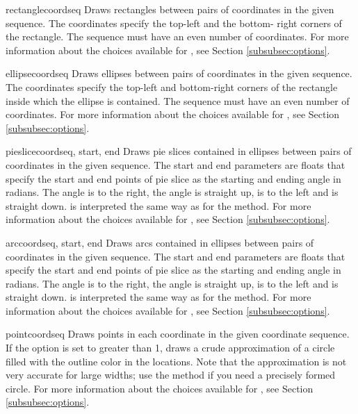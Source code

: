 \begin{methoddesc}{rectangle}{coordseq}
Draws rectangles between pairs of coordinates in the given sequence. The 
coordinates specify the top-left and the bottom- right corners of the 
rectangle. The sequence must have an even number of coordinates. For more 
information about the choices available for , see 
Section \ref{subsubsec:options}.
\end{methoddesc}

\begin{methoddesc}{ellipse}{coordseq}
Draws ellipses between pairs of coordinates in the given sequence. The
coordinates specify the top-left and bottom-right corners of the
rectangle inside which the ellipse is contained.  The sequence must
have an even number of coordinates. 
For more information about the choices available for , see 
Section \ref{subsubsec:options}.
\end{methoddesc}

\begin{methoddesc}{pieslice}{coordseq, start, end}
Draws pie slices contained in ellipses between pairs of coordinates in
the given sequence. The start and end parameters are floats that
specify the start and end points of pie slice as the starting and
ending angle in radians. The angle  is to the right, the angle
 is straight up,  is to the left and
is straight down.  is interpreted the same way as for
the  method.
For more 
information about the choices available for , see 
Section \ref{subsubsec:options}.
\end{methoddesc}

\begin{methoddesc}{arc}{coordseq, start, end}
Draws arcs contained in ellipses between pairs of coordinates in
the given sequence. The start and end parameters are floats that
specify the start and end points of pie slice as the starting and
ending angle in radians. The angle  is to the right, the angle
 is straight up,  is to the left and
is straight down.  is interpreted the same way as for
the  method.  For more information about the choices
available for , see Section
\ref{subsubsec:options}.
\end{methoddesc}

\begin{methoddesc}{point}{coordseq}
Draws points in each coordinate in the given coordinate sequence. If the 
 option is set to greater than 1, draws a crude approximation 
of a circle filled with the outline color in the locations. Note that
the approximation is not very accurate for large widths; use the
 method if you need a precisely formed circle. 
For more information about the choices
available for , see Section
\ref{subsubsec:options}.
\end{methoddesc}

